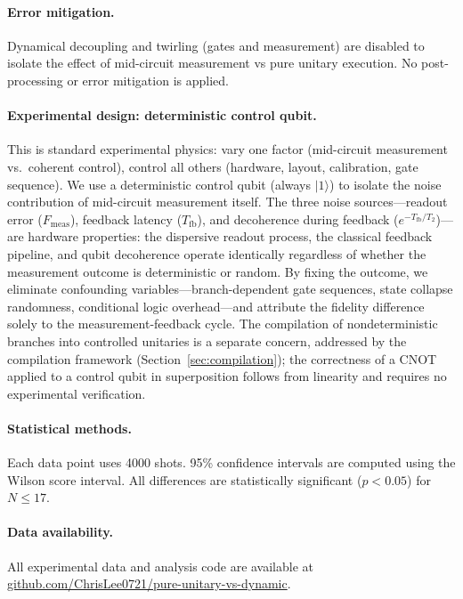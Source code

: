 \documentclass[11pt]{article}
\begin{document}
\paragraph{Error mitigation.}
Dynamical decoupling and twirling (gates and measurement) are disabled to isolate the effect of mid-circuit measurement vs pure unitary execution.
No post-processing or error mitigation is applied.

\paragraph{Experimental design: deterministic control qubit.}
This is standard experimental physics: vary one factor (mid-circuit measurement vs.\ coherent control), control all others (hardware, layout, calibration, gate sequence).
We use a deterministic control qubit (always $|1\rangle$) to isolate the noise contribution of mid-circuit measurement itself.
The three noise sources---readout error ($F_\text{meas}$), feedback latency ($T_\text{fb}$), and decoherence during feedback ($e^{-T_\text{fb}/T_2}$)---are hardware properties: the dispersive readout process, the classical feedback pipeline, and qubit decoherence operate identically regardless of whether the measurement outcome is deterministic or random.
By fixing the outcome, we eliminate confounding variables---branch-dependent gate sequences, state collapse randomness, conditional logic overhead---and attribute the fidelity difference solely to the measurement-feedback cycle.
The compilation of nondeterministic branches into controlled unitaries is a separate concern, addressed by the compilation framework (Section~\ref{sec:compilation}); the correctness of a CNOT applied to a control qubit in superposition follows from linearity and requires no experimental verification.

\paragraph{Statistical methods.}
Each data point uses 4000 shots.
95\% confidence intervals are computed using the Wilson score interval.
All differences are statistically significant ($p < 0.05$) for $N \leq 17$.

\paragraph{Data availability.}
All experimental data and analysis code are available at \href{https://github.com/ChrisLee0721/pure-unitary-vs-dynamic}{github.com/ChrisLee0721/pure-unitary-vs-dynamic}.
\end{document}
